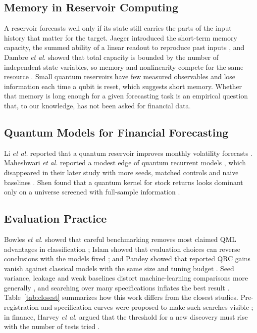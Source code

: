 \documentclass{ieeeaccess}
\begin{document}
\subsection{Memory in Reservoir Computing}
A reservoir forecasts well only if its state still carries the parts of the input history that matter for the target. Jaeger introduced the short-term memory capacity, the summed ability of a linear readout to reproduce past inputs \cite{jaeger2004}, and Dambre \emph{et al.} showed that total capacity is bounded by the number of independent state variables, so memory and nonlinearity compete for the same resource \cite{dambre2012}. Small quantum reservoirs have few measured observables and lose information each time a qubit is reset, which suggests short memory. Whether that memory is long enough for a given forecasting task is an empirical question that, to our knowledge, has not been asked for financial data.

\subsection{Quantum Models for Financial Forecasting}
Li \emph{et al.} reported that a quantum reservoir improves monthly volatility forecasts \cite{li2026}. Maheshwari \emph{et al.} reported a modest edge of quantum recurrent models \cite{maheshwari2026a}, which disappeared in their later study with more seeds, matched controls and naive baselines \cite{maheshwari2026b}. Shen found that a quantum kernel for stock returns looks dominant only on a universe screened with full-sample information \cite{shen2026}.

\subsection{Evaluation Practice}
Bowles \emph{et al.} showed that careful benchmarking removes most claimed QML advantages in classification \cite{bowles2024}; Islam showed that evaluation choices can reverse conclusions with the models fixed \cite{islam2026}; and Pandey showed that reported QRC gains vanish against classical models with the same size and tuning budget \cite{pandey2026}. Seed variance, leakage and weak baselines distort machine-learning comparisons more generally \cite{bouthillier2021,kapoor2023,arp2022}, and searching over many specifications inflates the best result \cite{white2000,hansen2005,harvey2016,bailey2014,simonsohn2020}. Table~\ref{tab:closest} summarizes how this work differs from the closest studies. Pre-registration and specification curves were proposed to make such searches visible \cite{simonsohn2020}; in finance, Harvey \emph{et al.} argued that the threshold for a new discovery must rise with the number of tests tried \cite{harvey2016}.
\end{document}
